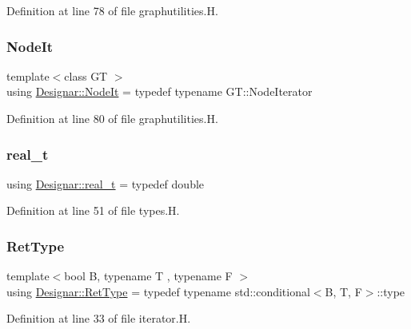 Definition at line 78 of file graphutilities.\+H.

\mbox{\label{namespace_designar_a5fdef28ed7c6b948482379ebabf927ce}} 
\subsubsection{\texorpdfstring{Node\+It}{NodeIt}}
{\footnotesize\ttfamily template$<$class GT $>$ \\
using \hyperlink{namespace_designar_a5fdef28ed7c6b948482379ebabf927ce}{Designar\+::\+Node\+It} = typedef typename G\+T\+::\+Node\+Iterator}



Definition at line 80 of file graphutilities.\+H.

\mbox{\label{namespace_designar_aca2c32af26808dbec1f3a3071fad25ce}} 
\subsubsection{\texorpdfstring{real\+\_\+t}{real\_t}}
{\footnotesize\ttfamily using \hyperlink{namespace_designar_aca2c32af26808dbec1f3a3071fad25ce}{Designar\+::real\+\_\+t} = typedef double}



Definition at line 51 of file types.\+H.

\mbox{\label{namespace_designar_ab937f9c4bf5f1d0e65dbc616245d50ee}} 
\subsubsection{\texorpdfstring{Ret\+Type}{RetType}}
{\footnotesize\ttfamily template$<$bool B, typename T , typename F $>$ \\
using \hyperlink{namespace_designar_ab937f9c4bf5f1d0e65dbc616245d50ee}{Designar\+::\+Ret\+Type} = typedef typename std\+::conditional$<$B, T, F$>$\+::type}



Definition at line 33 of file iterator.\+H.

\mbox{\label{namespace_designar_ad621b5646d45288c5d6a1e1dfe7531a8}} 
